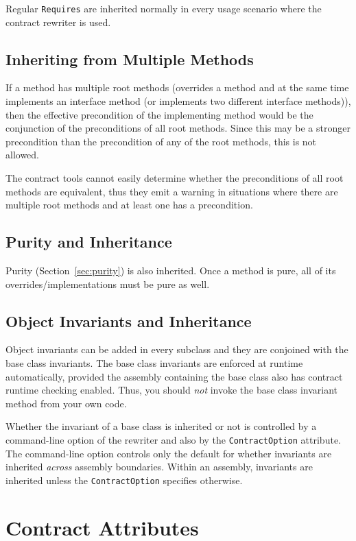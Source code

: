 \documentclass{article}
\newcommand{\code}[1]{\lstinline{#1}}
\begin{document}
Regular \code{Requires} are inherited normally in every usage scenario
where the contract rewriter is used.

\subsection{Inheriting from Multiple Methods}

If a method has multiple root methods (overrides a method and
at the same time implements an interface method (or implements two different
interface methods)), then the effective precondition of the
implementing method would be the conjunction of the preconditions
of all root methods. Since this may be a stronger
precondition than the precondition of any of the root methods, this is not allowed.

The contract tools cannot easily determine whether the preconditions of
all root methods are equivalent, thus they emit a warning in
situations where there are multiple root methods and at least one 
has a precondition.

\subsection{Purity and Inheritance}
\label{sec:purityinheritance}
Purity (Section~\ref{sec:purity}) is also inherited. Once a method is
pure, all of its overrides/implementations must be pure as well.

\subsection{Object Invariants and Inheritance}
Object invariants can be added in every subclass and they are
conjoined with the base class invariants. The base class
invariants are enforced at runtime automatically, provided the
assembly containing the base class also has contract runtime checking
enabled. Thus, you should \emph{not} invoke the  base class invariant
method from your own code.

Whether the invariant of a base class is inherited or not is controlled
by a command-line option of the rewriter and also by the \code{ContractOption}
attribute. The command-line option controls only the default for whether
invariants are inherited {\em across} assembly boundaries. Within an
assembly, invariants are inherited unless the \code{ContractOption}
specifies otherwise.

\section{Contract Attributes}
\end{document}

